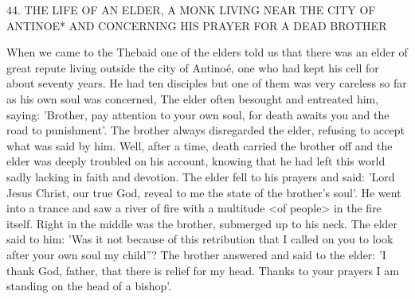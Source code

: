 44.
THE LIFE OF AN ELDER,
A MONK LIVING NEAR THE CITY OF ANTINOE*
AND CONCERNING HIS PRAYER
FOR A DEAD BROTHER

When we came to the Thebaid one of the elders told us that there
was an elder of great repute living outside the city of Antinoé, one
who had kept his cell for about seventy years.
He had ten disciples
but one of them was very careless so far as his own soul was
concerned, The elder often besought and entreated him, saying:
'Brother, pay attention to your own soul, for death awaits you and
the road to punishment'.
The brother always disregarded the elder,
refusing to accept what was said by him.
Well, after a time, death
carried the brother off and the elder was deeply troubled on his
account, knowing that he had left this world sadly lacking in faith
and devotion.
The elder fell to his prayers and said: 'Lord Jesus
Christ, our true God, reveal to me the state of the brother's soul'.
He went into a trance and saw a river of fire with a multitude <of
people> in the fire itself.
Right in the middle was the brother,
submerged up to his neck.
The elder said to him: 'Was it not
because of this retribution that I called on you to look after your
own soul my child”? The brother answered and said to the elder: 'I
thank God, father, that there is relief for my head.
Thanks to your
prayers I am standing on the head of a bishop'.

